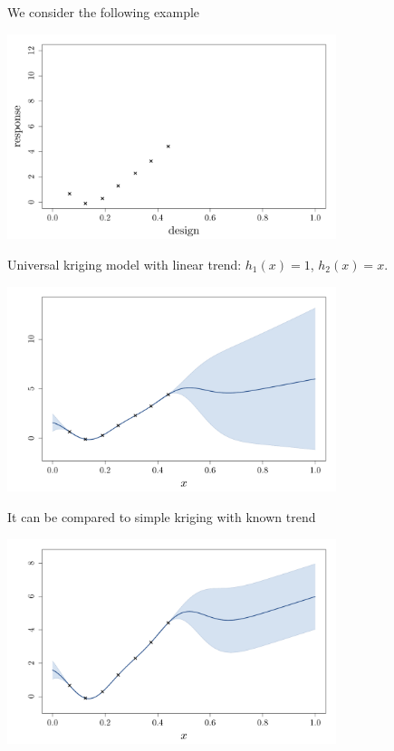 \documentclass{beamer}
\begin{document}
\begin{frame}{}
We consider the following example
\begin{center}
	\includegraphics[height=6cm]{figures/R/trend_data}
\end{center}
\end{frame}

\begin{frame}{}
Universal kriging model with linear trend: $h_1(x) = 1$, $h_2(x) = x$.
\begin{center}
	\includegraphics[height=6cm]{figures/R/trend_ku}
\end{center}
\end{frame}

\begin{frame}{}
It can be compared to simple kriging with known trend
\begin{center}
	\includegraphics[height=6cm]{figures/R/trend_kstrend}
\end{center}
\end{frame}
\end{document}

